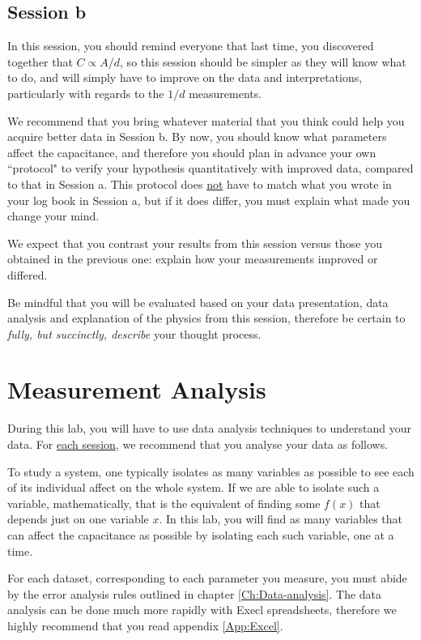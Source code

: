 \documentclass[12pt]{report}
\begin{document}
\subsection{Session b}

\begin{tcolorbox}[title=Session \#2]
In this session, you should remind everyone that last time, you discovered together that $C \propto A/d$, so this session should be simpler as they will know what to do, and will simply have to improve on the data and interpretations, particularly with regards to the $1/d$ measurements.
\end{tcolorbox}

We recommend that you bring whatever material that you think could help you acquire better data in Session b. 
By now, you should know what parameters affect the capacitance, and therefore you should plan in advance your own ``protocol" to verify your hypothesis quantitatively with improved data, compared to that in Session a. 
This protocol does \underline{not} have to match what you wrote in your log book in Session a, but if it does differ, you must explain what made you change your mind.

{\color{blue} We expect that you contrast your results from this session versus those you obtained in the previous one: explain how your measurements improved or differed.}

{\color{blue}Be mindful that you will be evaluated based on your data presentation, data analysis and explanation of the physics from this session, therefore be certain to \textit{fully, but succinctly, describe} your thought process.} 

\section{Measurement Analysis}
\label{Sec:lab1-analysis}
During this lab, you will have to use data analysis techniques to understand your data. For \underline{each session}, we recommend that you analyse your data as follows.

To study a system, one typically isolates as many variables as possible to see each of its individual affect on the whole system. If we are able to isolate such a variable, mathematically, that is the equivalent of finding some $f(x)$ that depends just on one variable $x$. In this lab, you will find as many variables that can affect the capacitance as possible by isolating each such variable, one at a time.

For each dataset, corresponding to each parameter you measure, you must abide by the error analysis rules outlined in chapter \ref{Ch:Data-analysis}. 
The data analysis can be done much more rapidly with Execl spreadsheets, therefore we highly recommend that you read appendix \ref{App:Excel}. 
\end{document}
